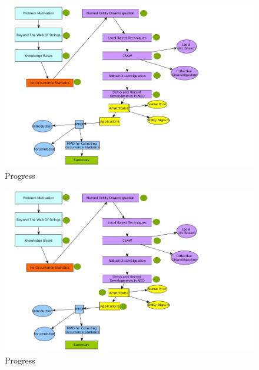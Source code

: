 \documentclass{beamer}
\begin{document}

  \begin{frame}
 \begin{center}
 \begin{figure}[h]
 
 \includegraphics[bb=0 0 937 610, scale=0.35]{./mark2.jpg}
 \caption{Progress}
\end{figure}
\end{center}
\end{frame}

\begin{frame}
 \begin{center}
 \begin{figure}[h]
 
 \includegraphics[bb=0 0 937 610, scale=0.35]{./mark3.jpg}
 \caption{Progress}
\end{figure}
\end{center}
\end{frame}
\end{document}
